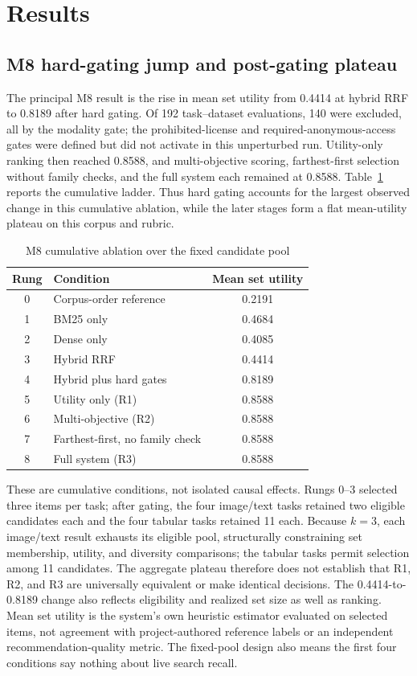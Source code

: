 \documentclass[conference]{IEEEtran}
\begin{document}
\section{Results}
\subsection{M8 hard-gating jump and post-gating plateau}
The principal M8 result is the rise in mean set utility from 0.4414 at hybrid RRF to 0.8189 after hard gating. Of 192 task--dataset evaluations, 140 were excluded, all by the modality gate; the prohibited-license and required-anonymous-access gates were defined but did not activate in this unperturbed run. Utility-only ranking then reached 0.8588, and multi-objective scoring, farthest-first selection without family checks, and the full system each remained at 0.8588. Table~\ref{tab:ablation} reports the cumulative ladder. Thus hard gating accounts for the largest observed change in this cumulative ablation, while the later stages form a flat mean-utility plateau on this corpus and rubric.

\begin{table}[t]
\caption{M8 cumulative ablation over the fixed candidate pool}
\label{tab:ablation}
\centering
\footnotesize
\begin{tabular}{clc}
\toprule
Rung & Condition & Mean set utility\\
\midrule
0 & Corpus-order reference & 0.2191\\
1 & BM25 only & 0.4684\\
2 & Dense only & 0.4085\\
3 & Hybrid RRF & 0.4414\\
4 & Hybrid plus hard gates & 0.8189\\
5 & Utility only (R1) & 0.8588\\
6 & Multi-objective (R2) & 0.8588\\
7 & Farthest-first, no family check & 0.8588\\
8 & Full system (R3) & 0.8588\\
\bottomrule
\end{tabular}
\end{table}

These are cumulative conditions, not isolated causal effects. Rungs 0--3 selected three items per task; after gating, the four image/text tasks retained two eligible candidates each and the four tabular tasks retained 11 each. Because $k=3$, each image/text result exhausts its eligible pool, structurally constraining set membership, utility, and diversity comparisons; the tabular tasks permit selection among 11 candidates. The aggregate plateau therefore does not establish that R1, R2, and R3 are universally equivalent or make identical decisions. The 0.4414-to-0.8189 change also reflects eligibility and realized set size as well as ranking. Mean set utility is the system's own heuristic estimator evaluated on selected items, not agreement with project-authored reference labels or an independent recommendation-quality metric. The fixed-pool design also means the first four conditions say nothing about live search recall.
\end{document}
